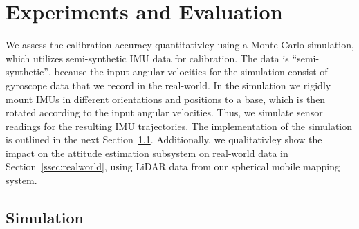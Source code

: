 \documentclass[journal]{IEEEtran}
\begin{document}
\section{Experiments and Evaluation}
We assess the calibration accuracy quantitativley using a Monte-Carlo simulation, which utilizes semi-synthetic IMU data for calibration.
The data is ``semi-synthetic'', because the input angular velocities for the simulation consist of gyroscope data that we record in the real-world.
In the simulation we rigidly mount IMUs in different orientations and positions to a base, which is then rotated according to the input angular velocities.
Thus, we simulate sensor readings for the resulting IMU trajectories.
The implementation of the simulation is outlined in the next Section~\ref{ssec:simulation}.
Additionally, we qualitativley show the impact on the attitude estimation subsystem on real-world data in Section~\ref{ssec:realworld}, using LiDAR data from our spherical mobile mapping system. 

\subsection{Simulation}\label{ssec:simulation}
\end{document}
